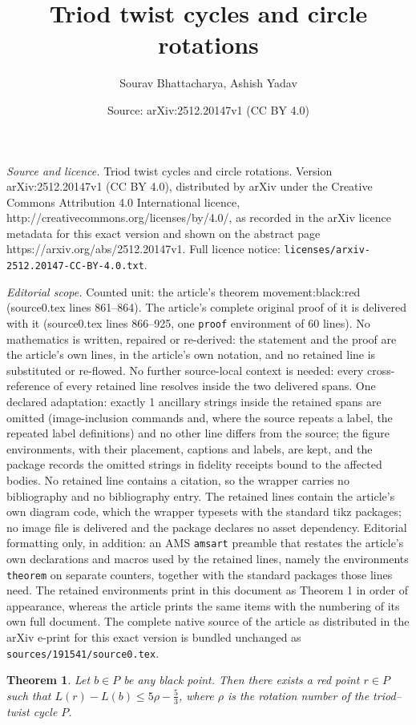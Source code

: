 \documentclass[10pt,a4paper]{amsart}
\title{Triod twist cycles and circle rotations}
\author{Sourav Bhattacharya, Ashish Yadav}
\date{Source: arXiv:2512.20147v1 (CC BY 4.0)}
\newtheorem{theorem}{Theorem}
\begin{document}
\maketitle

\noindent\emph{Source and licence.} Triod twist cycles and circle rotations. Version arXiv:2512.20147v1 (CC BY 4.0), distributed by arXiv under the Creative Commons Attribution 4.0 International licence, http://creativecommons.org/licenses/by/4.0/, as recorded in the arXiv licence metadata for this exact version and shown on the abstract page https://arxiv.org/abs/2512.20147v1. Full licence notice: \texttt{licenses/arxiv-2512.20147-CC-BY-4.0.txt}.\par\smallskip

\noindent\textit{Editorial scope.} Counted unit: the article's theorem movement:black:red (source0.tex lines 861--864). The article's complete original proof of it is delivered with it (source0.tex lines 866--925, one \texttt{proof} environment of 60 lines). No mathematics is written, repaired or re-derived: the statement and the proof are the article's own lines, in the article's own notation, and no retained line is substituted or re-flowed.  No further source-local context is needed: every cross-reference of every retained line resolves inside the two delivered spans.  One declared adaptation: exactly 1 ancillary strings inside the retained spans are omitted (image-inclusion commands and, where the source repeats a label, the repeated label definitions) and no other line differs from the source; the figure environments, with their placement, captions and labels, are kept, and the package records the omitted strings in fidelity receipts bound to the affected bodies.  No retained line contains a citation, so the wrapper carries no bibliography and no bibliography entry.  The retained lines contain the article's own diagram code, which the wrapper typesets with the standard tikz packages; no image file is delivered and the package declares no asset dependency.  Editorial formatting only, in addition: an AMS \texttt{amsart} preamble that restates the article's own declarations and macros used by the retained lines, namely the environments \texttt{theorem} on separate counters, together with the standard packages those lines need.  The retained environments print in this document as Theorem 1 in order of appearance, whereas the article prints the same items with the numbering of its own full document.  The complete native source of the article as distributed in the arXiv e-print for this exact version is bundled unchanged as \texttt{sources/191541/source0.tex}.
\begin{theorem}\label{movement:black:red}
	Let $b \in P$ be any black point. Then there exists a red point $r \in P$ such that 
	$	L(r) - L(b) \leqslant 5\rho - \tfrac{5}{3}$,	where $\rho$ is the rotation number of the triod–twist cycle $P$.
\end{theorem}
\end{document}
